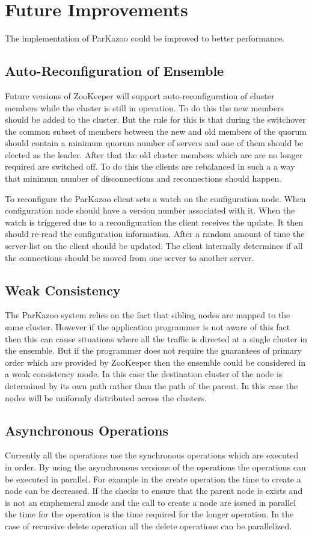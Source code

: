 \chapter{Future Improvements}
The implementation of ParKazoo could be improved to better performance. 

\section{Auto-Reconfiguration of Ensemble}
Future versions of ZooKeeper will support auto-reconfiguration of cluster members while the cluster is still in operation. To do this the new members should be added to the cluster. But the rule for this is that during the switchover the common subset of members between the new and old members of the quorum should contain a minimum quorum number of servers and one of them should be elected as the leader. After that the old cluster members which are are no longer required are switched off. To do this the clients are rebalanced in such a a way that minimum number of disconnections and reconnections should happen. 

	To reconfigure the ParKazoo client sets a watch on the configuration node. When configuration node should have a version number associated with it. When the watch is triggered due to a reconfiguration the client receives the update. It then should re-read the configuration information. After a random amount of time the server-list on the client should be updated. The client internally determines if all the connections should be moved from one server to another server.

\section{Weak Consistency}
The ParKazoo system relies on the fact that sibling nodes are mapped to the same cluster. However if the application programmer is not aware of this fact then this can cause situations where all the traffic is directed at a single cluster in the ensemble. But if the programmer does not require the guarantees of primary order which are provided by ZooKeeper then the ensemble could be considered in a weak consistency mode. In this case the destination cluster of the node is determined by its own path rather than the path of the parent. In this case the nodes will be uniformly distributed across the clusters.

\section{Asynchronous Operations}
Currently all the operations use the synchronous operations which are executed in order. By using the asynchronous versions of the operations the operations can be executed in parallel. For example in the create operation the time to create a node can be decreased. If the checks to ensure that the parent node is exists and is not an emphemeral znode and the call to create a node are issued in parallel the time for the operation is the time required for the longer operation. In the case of recursive delete operation all the delete operations can be parallelized.